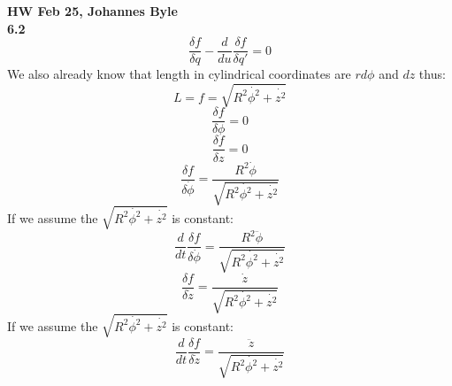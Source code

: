 \documentclass[english]{article}
\begin{document}
\textbf{HW Feb 25, Johannes Byle}\\

\noindent
\textbf{6.2} $$\frac{\delta f}{\delta q}-\frac{d}{du}\frac{\delta f}{\delta q'}=0$$
We also already know that length in cylindrical coordinates are $rd\phi$ and $dz$ thus:
$$L=f=\sqrt{R^2\dot{\phi^2}+\dot{z^2}}$$
$$\frac{\delta f}{\delta \phi}=0$$
$$\frac{\delta f}{\delta z}=0$$
$$\frac{\delta f}{\delta \dot{\phi}}=\frac{R^2\dot{\phi}}{\sqrt{R^2\dot{\phi^2}+\dot{z^2}}}$$
If we assume the $\sqrt{R^2\dot{\phi^2}+\dot{z^2}}$ is constant:
$$\frac{d}{dt}\frac{\delta f}{\delta \dot{\phi}}=\frac{R^2\ddot{\phi}}{\sqrt{R^2\dot{\phi^2}+\dot{z^2}}}$$
$$\frac{\delta f}{\delta \dot{z}}=\frac{\dot{z}}{\sqrt{R^2\dot{\phi^2}+\dot{z^2}}}$$
If we assume the $\sqrt{R^2\dot{\phi^2}+\dot{z^2}}$ is constant:
$$\frac{d}{dt}\frac{\delta f}{\delta \dot{z}}=\frac{\ddot{z}}{\sqrt{R^2\dot{\phi^2}+\dot{z^2}}}$$
\end{document}
